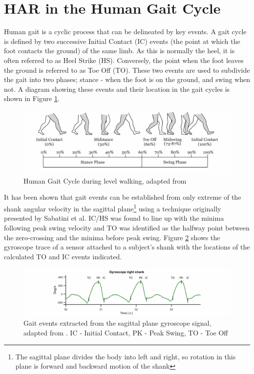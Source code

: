 \documentclass[sensors,article,submit,moreauthors,pdftex]{Definitions/mdpi}
\begin{document}
\section{HAR in the Human Gait Cycle}
\label{sec:human_gait_cycle}
Human gait is a cyclic process that can be delineated by key events. A gait cycle is defined by two successive Initial Contact (IC) events (the point at which the foot contacts the ground) of the same limb. As this is normally the heel, it is often referred to as Heel Strike (HS). Conversely, the point when the foot leaves the ground is referred to as Toe Off (TO). These two events are used to subdivide the gait into two phases; stance - when the foot is on the ground, and swing when not. A diagram showing these events and their location in the gait cycles is shown in Figure \ref{fig:gait_cycle}.

\begin{figure}[!htb]
    \centering
    \includegraphics[width=\textwidth]{Figures/Gait_Cycle.jpg}
    \caption{Human Gait Cycle during level walking, adapted from \cite{humanGaitCycle2016}}
    \label{fig:gait_cycle}
\end{figure}

It has been shown that gait events can be established from only extreme of the shank angular velocity in the sagittal plane\footnote{The sagittal plane divides the body into left and right, so rotation in this plane is forward and backward motion of the shank}  using a technique originally presented by Sabatini et al\cite{Sabatini2005}. IC/HS was found to line up with the minima following peak swing velocity and TO was identified as the halfway point between the zero-crossing and the minima before peak swing. Figure \ref{fig:y-gyro-hs-to} shows the gyroscope trace of a sensor attached to a subject's shank with the locations of the calculated TO and IC events indicated.

\begin{figure}[!htb]
    \centering
    \includegraphics[width=\textwidth]{Figures/gyro_trace_hs.jpg}
    \caption{Gait events extracted from the sagittal plane gyroscope signal, adapted from \cite{Sabatini2005}. IC - Initial Contact, PK - Peak Swing, TO - Toe Off}
    \label{fig:y-gyro-hs-to}
\end{figure}
\end{document}
